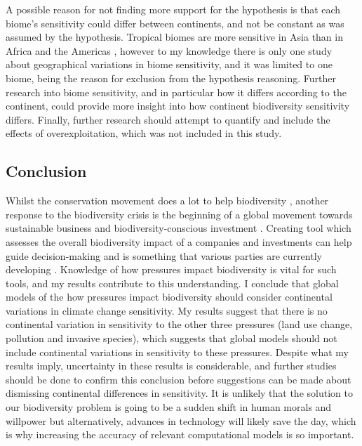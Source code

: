 \documentclass[11pt, a4paper, titlepage]{article}
\begin{document}
     A possible reason for not finding more support for the hypothesis is that each biome's sensitivity could differ between continents, and not be constant as was assumed by the hypothesis. Tropical biomes are more sensitive in Asia than in Africa and the Americas \citep{gibson2011primary}, however to my knowledge there is only one study about geographical variations in biome sensitivity, and it was limited to one biome, being the reason for exclusion from the hypothesis reasoning. Further research into biome sensitivity, and in particular how it differs according to the continent, could provide more insight into how continent biodiversity sensitivity differs. Finally, further research should attempt to quantify and include the effects of overexploitation, which was not included in this study. 
        
	\subsection*{Conclusion}
	
    Whilst the conservation movement does a lot to help biodiversity \citep{sandbrook2019global}, another response to the biodiversity crisis \citep{ogar2020science} is the beginning of a global movement towards sustainable business and biodiversity-conscious investment \citep{pri2020, worldeconomicforum2020, wwf2020}. Creating tool which assesses the overall biodiversity impact of a companies and investments can help guide decision-making and is something that various parties are currently developing \citep{worldbenchmarkingalliance_2022, iccs_2020}. Knowledge of how pressures impact biodiversity is vital for such tools, and my results contribute to this understanding. I conclude that global models of the how pressures impact biodiversity should consider continental variations in climate change sensitivity. My results suggest that there is no continental variation in sensitivity to the other three pressures (land use change, pollution and invasive species), which suggests that global models should not include continental variations in sensitivity to these pressures. Despite what my results imply, uncertainty in these results is considerable, and further studies should be done to confirm this conclusion before suggestions can be made about dismissing continental differences in sensitivity.     It is unlikely that the solution to our biodiversity problem is going to be a sudden shift in human morals and willpower but alternatively, advances in technology will likely save the day, which is why increasing the accuracy of relevant computational models is so important. 
    \clearpage
    
\end{document}
